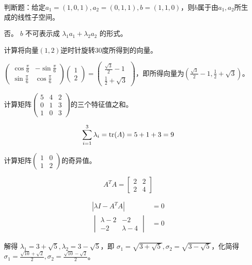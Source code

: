 \begin{problem}
	判断题：给定$a_1=(1,0,1),a_2=(0,1,1),b=(1,1,0)$，则$b$属于由$a_1,a_2$所生成的线性子空间。
\end{problem}
\begin{solution}
	否。 $b$ 不可表示成 $\lambda_1 a_1 + \lambda_2 a_2$ 的形式。
\end{solution}


\begin{problem}
	计算将向量$(1,2)$逆时针旋转$30$度所得到的向量。
\end{problem}
\begin{solution}
	$\begin{pmatrix}
		\cos\frac{\pi}{6}&-\sin\frac{\pi}{6}\\\sin\frac{\pi}{6}&\cos\frac{\pi}{6}
	\end{pmatrix}\begin{pmatrix}
		1\\2
	\end{pmatrix}=\begin{pmatrix}
		\frac{\sqrt{3}}{2}-1\\\frac{1}{2}+\sqrt{3}
	\end{pmatrix}$，即所得向量为$(\frac{\sqrt{3}}{2}-1,\frac{1}{2}+\sqrt{3})$。
\end{solution}


\begin{problem}
	计算矩阵$\begin{pmatrix}
		5&4&2\\0&1&3\\1&0&3
	\end{pmatrix}$的三个特征值之和。
\end{problem}
\begin{solution}
	$$\sum_{i=1}^3 \lambda_i = \operatorname{tr}(A) = 5 + 1 + 3 = 9$$
\end{solution}


\begin{problem}
	计算矩阵$\begin{pmatrix}
		1&0\\1&2
	\end{pmatrix}$的奇异值。
\end{problem}
\begin{solution}
	\[A^TA = \begin{bmatrix}
		2 & 2 \\
		2 & 4
	\end{bmatrix}\]

	\begin{align*}
		|\lambda I - A^TA| &= 0\\
		\begin{vmatrix}
			\lambda - 2 & -2 \\
			-2 & \lambda - 4
		\end{vmatrix} &= 0
	\end{align*}

	解得 $\lambda_1 = 3 + \sqrt{5}, \lambda_2 = 3 - \sqrt{5}$，即 $\sigma_1 = \sqrt{3 + \sqrt{5}}, \sigma_2 = \sqrt{3 - \sqrt{5}}$，化简得 $\sigma_1 = \frac{\sqrt{10} + \sqrt{2}}{2}, \sigma_2 = \frac{\sqrt{10} - \sqrt{2}}{2}$。
\end{solution}


